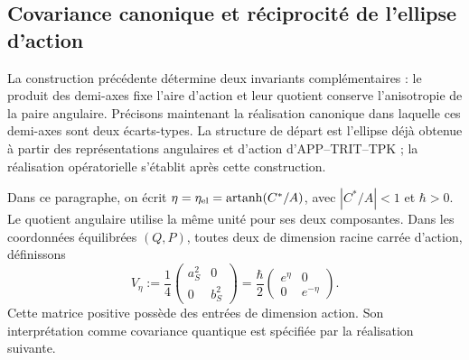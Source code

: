 
\subsection{Covariance canonique et réciprocité de l'ellipse d'action}
\label{sec:ii-area-covarianza}

La construction précédente détermine deux invariants complémentaires :
le produit des demi-axes fixe l’aire d’action et leur quotient conserve
l’anisotropie de la paire angulaire. Précisons maintenant la réalisation canonique
dans laquelle ces demi-axes sont deux écarts-types. La structure de
départ est l’ellipse déjà obtenue à partir des représentations angulaires et
d’action d’APP--TRIT--TPK ; la réalisation opératorielle s’établit après
cette construction.

Dans ce paragraphe, on écrit \(\eta=\eta_{\rm el}
=\operatorname{artanh}(C^*/A)\), avec \(|C^*/A|<1\) et
\(\hbar>0\). Le quotient angulaire utilise la même unité pour ses deux
composantes. Dans les coordonnées équilibrées \((Q,P)\), toutes deux de
dimension racine carrée d'action, définissons
\begin{equation}
 V_\eta:=\frac14
 \begin{pmatrix}a_S^2&0\\0&b_S^2\end{pmatrix}
 =\frac{\hbar}{2}
 \begin{pmatrix}e^\eta&0\\0&e^{-\eta}\end{pmatrix}.
 \label{eq:ii-covarianza-geometrica}
\end{equation}
Cette matrice positive possède des entrées de dimension action. Son interprétation
comme covariance quantique est spécifiée par la réalisation suivante.

